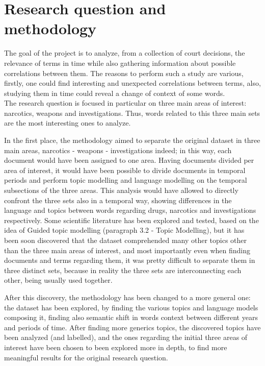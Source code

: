 \section{Research question and methodology}

The goal of the project is to analyze, from a collection 
of court decisions, the relevance of terms in time while 
also gathering information about possible correlations between 
them. The reasons to perform such a study are various, firstly, 
one could find interesting and unexpected correlations between terms, 
also, studying them in time could reveal a change of 
context of some words.\\
The research question is focused in particular on three main areas of interest:
narcotics, weapons and investigations. Thus, words related to this three main sets
are the most interesting ones to analyze.

In the first place, the methodology aimed to separate the original dataset in three main areas,
narcotics - weapons - investigations indeed; in this way, each document would have been assigned to one area.
Having documents divided per area of interest, it would have been possible to divide documents in temporal
periods and perform topic modelling and language modelling on the temporal subsections of the three areas. This
analysis would have allowed to directly confront the three sets also in a temporal way, showing differences
in the language and topics between words regarding drugs, narcotics and investigations respectively.
Some scientific literature has been explored and tested, based on the idea of Guided topic modelling (paragraph 3.2 -
Topic Modelling), but it has been soon discovered that the dataset comprehended many other topics other than the
three main areas of interest, and most importantly even when finding documents and terms regarding them,
it was pretty difficult to separate them in three distinct sets, because in reality the three sets are
interconnecting each other, being usually used together.

After this discovery, the methodology has been changed to a more general one: the dataset has been explored, by finding
the various topics and language models composing it, finding also semantic shift in words context between different
years and periods of time. After finding more generics topics, the discovered topics have been analyzed (and labelled),
and the ones regarding the initial three areas of interest have been chosen to been explored more in depth, to find
more meaningful results for the original research question.